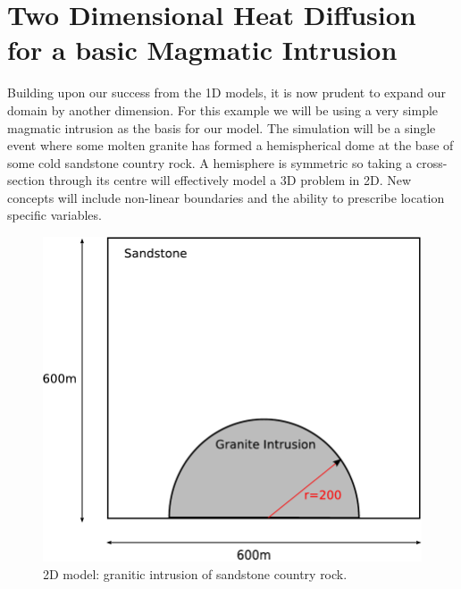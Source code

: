 
%
%
%

\section{Two Dimensional Heat Diffusion for a basic Magmatic Intrusion}
 Building upon our success from the 1D models, it is now prudent to expand our domain by another dimension. For this example we will be using a very simple magmatic intrusion as the basis for our model. The simulation will be a single event where some molten granite has formed a hemispherical dome at the base of some cold sandstone country rock. A hemisphere is symmetric so taking a cross-section through its centre will effectively model a 3D problem in 2D. New concepts will include non-linear boundaries and the ability to prescribe location specific variables.

\begin{figure}[h!]
\centerline{\includegraphics[width=4.in]{figures/twodheatdiff}}
\caption{2D model: granitic intrusion of sandstone country rock.}
\label{fig:twodhdmodel}
\end{figure}

